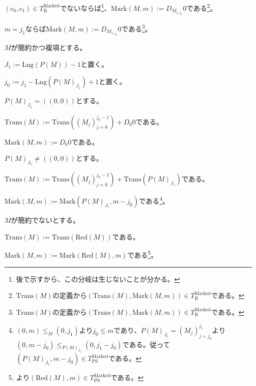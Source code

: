 \documentclass[dvipdfmx,uplatex]{jsarticle}
\theoremstyle{customnonumberbreakfortheorem}
\theoremstyle{customnonumberbreakforproof}
\begin{document}
\begin{nenumerate}
\begin{nenumerate}
\begin{nenumerate}
\begin{nenumerate}
\begin{nenumerate}
				\end{nenumerate}
				\item \((c_0,c_1) \in T_{\textrm{B}}^{\textrm{Marked}}\)でないならば\footnote{後で示すから、この分岐は生じないことが分かる。}、\(\textrm{Mark}(M,m) := D_{M_{1,j_1}} 0\)である\footnote{\(\textrm{Trans}(M)\)の定義から\((\textrm{Trans}(M),\textrm{Mark}(M,m)) \in T_{\textrm{B}}^{\textrm{Marked}}\)である。}。
			\end{nenumerate}
			\item \(m = j_1\)ならば\(\textrm{Mark}(M,m) := D_{M_{1,j_1}} 0\)である\footnote{\(\textrm{Trans}(M)\)の定義から\((\textrm{Trans}(M),\textrm{Mark}(M,m)) \in T_{\textrm{B}}^{\textrm{Marked}}\)である。}。
		\end{nenumerate}
	\end{nenumerate}
	\item \(M\)が簡約かつ複項とする。
	\begin{nenumerate}
		\item \(J_1 := \textrm{Lng}(P(M))-1\)と置く。
		\item \(j_0 := j_1 - \textrm{Lng}(P(M)_{J_1}) + 1\)と置く。
		\item \(P(M)_{J_1} = ((0,0))\)とする。
		\begin{nenumerate}
			\item \(\textrm{Trans}(M) := \textrm{Trans}((M_j)_{j=0}^{j_0-1}) + D_0 0\)である。
			\item \(\textrm{Mark}(M,m) := D_0 0\)である。
		\end{nenumerate}
		\item \(P(M)_{J_1} \neq ((0,0))\)とする。
		\begin{nenumerate}
			\item \(\textrm{Trans}(M) := \textrm{Trans}((M_j)_{j=0}^{j_0-1}) + \textrm{Trans}(P(M)_{J_1})\)である。
			\item \(\textrm{Mark}(M,m) := \textrm{Mark}(P(M)_{J_1},m-j_0)\)である\footnote{\((0,m) \leq_M (0,j_1)\)より\(j_0 \leq m\)であり、\(P(M)_{J_1} = (M_j)_{j=j_0}^{j_1}\)より\((0,m-j_0) \leq_{P(M)_{J_1}} (0,j_1-j_0)\)である。従って\((P(M)_{J_1},m-j_0) \in T_{\textrm{PS}}^{\textrm{Marked}}\)である。}。
		\end{nenumerate}
	\end{nenumerate}
	\item \(M\)が簡約でないとする。
	\begin{nenumerate}
		\item \(\textrm{Trans}(M) :=　\textrm{Trans}(\textrm{Red}(M))\)である。
		\item \(\textrm{Mark}(M,m) := \textrm{Mark}(\textrm{Red}(M),m)\)である\footnote{より\((\textrm{Red}(M),m) \in T_{\textrm{PS}}^{\textrm{Marked}}\)である。}。
	\end{nenumerate}
\end{nenumerate}
\end{document}
